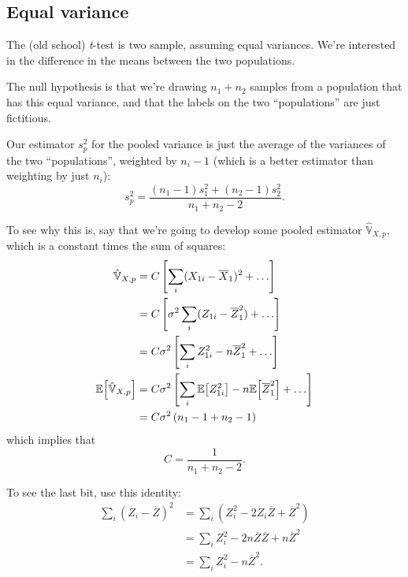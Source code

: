 \subsection{Equal variance}\label{equal-variance}

The (old school) \emph{t}-test is two sample, assuming equal variances.
We're interested in the difference in the means between the two
populations.

The null hypothesis is that we're drawing \(n_1 + n_2\) samples from a
population that has this equal variance, and that the labels on the two
``populations'' are just fictitious.

Our estimator \(s_p^2\) for the pooled variance is just the average of
the variances of the two ``populations'', weighted by \(n_i - 1\) (which
is a better estimator than weighting by just \(n_i\)): \[
s_p^2 = \frac{(n_1 - 1) s_1^2 + (n_2 - 1) s_2^2}{n_1 + n_2 - 2}.
\]

To see why this is, say that we're going to develop some pooled estimator
$\hat{\mathbb{V}}_{X,p}$, which is a constant times the sum of squares:
\begin{align}
\hat{\mathbb{V}}_{X,p} &= C \left[ \sum_i (X_{1i} - \overline{X}_1)^2 + \ldots \right] \\
  &= C \left[ \sigma^2 \sum_i (Z_{1i} - \overline{Z}_1^2 ) + \ldots \right] \\
  &= C \sigma^2 \left[ \sum_i Z_{1i}^2 - n \overline{Z}_1^2 + \ldots \right] \\
\mathbb{E}\!\left[{\hat{\mathbb{V}}_{X,p}}\right] &= C \sigma^2 \left[ \sum_i \mathbb{E}\!\left[{Z_{1i}^2}\right] - n \mathbb{E}\!\left[{\overline{Z}_1^2}\right] + \ldots \right] \\
  &= C \sigma^2 \left( n_1 - 1 + n_2 - 1 \right) \\
\end{align}
which implies that
\begin{equation}
C = \frac{1}{n_1 + n_2 - 2}.
\end{equation}

To see the last bit, use this identity:
\begin{align}
\sum_i (Z_i - \overline{Z})^2 &= \sum_i (Z_i^2 - 2 Z_i \overline{Z} + \overline{Z}^2) \\
  &= \sum_i Z_i^2 - 2 n \overline{Z} \overline{Z} + n \overline{Z}^2 \\
  &= \sum_i Z_i^2 - n \overline{Z}^2.
\end{align}

